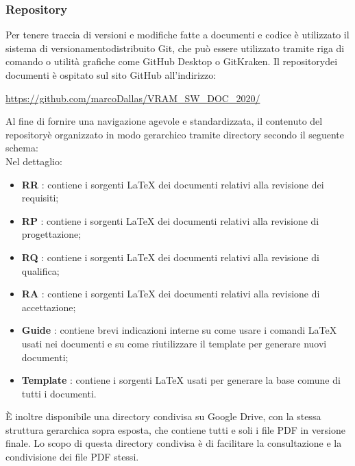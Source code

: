 	\subsubsection{Repository}
		Per tenere traccia di versioni e modifiche fatte a documenti e codice è utilizzato il sistema di versionamento\glosp distribuito Git, che può essere utilizzato tramite riga di comando o utilità grafiche come GitHub Desktop o GitKraken.
		Il repository\glosp dei documenti è ospitato sul sito GitHub all'indirizzo: 
		\begin{center}
			\url{https://github.com/marcoDallas/VRAM_SW_DOC_2020/}
		\end{center}
		Al fine di fornire una navigazione agevole e standardizzata, il contenuto del repository\glosp è organizzato in modo gerarchico tramite directory secondo il seguente schema:
		\newline
		\mbox{}\\ %
		Nel dettaglio:
		\begin{itemize}
			\item \textbf{RR} : contiene i sorgenti \LaTeX \xspace dei documenti relativi alla revisione dei requisiti;
			\item \textbf{RP} : contiene i sorgenti \LaTeX \xspace dei documenti relativi alla revisione di progettazione;
			\item \textbf{RQ} : contiene i sorgenti \LaTeX \xspace dei documenti relativi alla revisione di qualifica;
			\item \textbf{RA} : contiene i sorgenti \LaTeX \xspace dei documenti relativi alla revisione di accettazione; 
			\item \textbf{Guide} : contiene brevi indicazioni interne su come usare i comandi \LaTeX \xspace usati nei documenti e su come riutilizzare il template per generare nuovi documenti;
			\item \textbf{Template} : contiene i sorgenti \LaTeX \xspace usati per generare la base comune di tutti i documenti.
		\end{itemize}
		È inoltre disponibile una directory condivisa su Google Drive, con la stessa struttura gerarchica sopra esposta, che contiene tutti e soli i file PDF in versione finale. Lo scopo di questa directory condivisa è di facilitare la consultazione e la condivisione dei file PDF stessi.
		
